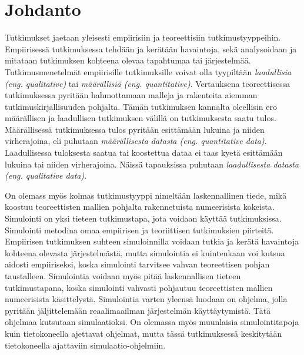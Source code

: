 \documentclass[utf8]{gradu3}
\begin{document}

\author{Jaakko Palm}

\maketitle

\mainmatter

\chapter{Johdanto} \label{johdanto}
Tutkimukset jaetaan yleisesti empiirisiin ja teoreettisiin tutkimustyyppeihin.
Empiirisessä tutkimuksessa tehdään  ja kerätään havaintoja, sekä analysoidaan 
ja mitataan tutkimuksen kohteena olevaa tapahtumaa tai järjestelmää. 
Tutkimusmenetelmät empiirisille tutkimuksille voivat olla 
tyypiltään \textit{laadullisia (eng. qualitative)} 
tai \textit{määrällisiä (eng. quantitative)}. 
Vertauksena teoreettisessa tutkimuksessa pyritään hahmottamaan 
malleja ja rakenteita aiemman tutkimuskirjallisuuden pohjalta. 
Tämän tutkimuksen kannalta oleellisin ero määrällisen ja laadullisen tutkimuksen 
välillä on tutkimuksesta saatu tulos.
Määrällisessä tutkimuksessa tulos pyritään esittämään lukuina ja niiden virherajoina,
eli puhutaan \textit{määrällisesta datasta (eng. quantitative data)}. 
Laadullisessa tuloksesta saatua tai koostettua dataa ei taas kyetä esittämään 
lukuina tai niiden virherajoina. Näissä tapauksissa puhutaan 
\textit{laadullisesta datasta (eng. qualitative data)}.

On olemass myös kolmas tutkimustyyppi nimeltään laskennallinen tiede, 
mikä koostuu teoreettisten mallien pohjalta rakennetuista numeerisista kokeista. 
Simulointi on yksi tieteen tutkimustapa, jota voidaan käyttää tutkimuksissa.
Simulointi metodina omaa empiirisen ja teoriittisen tutkimuksien piirteitä.
Empiirisen tutkimuksen suhteen simuloinnilla voidaan tutkia ja kerätä havaintoja
kohteena olevasta järjestelmästä, mutta simulointia ei 
kuintenkaan voi kutsua aidosti empiiriseksi,
koska simulointi tarvitsee vahvan teoreettisen pohjan taustalleen.
Simulointia voidaan myös pitää laskennallisen tieteen tutkimustapana, 
koska simulointi vahvasti pohjautuu teoreettisten mallien numeerisista käsittelystä.
Simulointia varten yleensä luodaan on ohjelma, 
jolla pyritään jäljittelemään reaalimaailman järjestelmän käyttäytymistä.
Tätä ohjelmaa kutsutaan simulaatioksi.
On olemassa myös muunlaisia simulointitapoja kuin tietokoneella ajettavat ohjelmat, mutta 
tässä tutkimuksessä keskitytään tietokoneella ajattaviin simulaatio-ohjelmiin.
\end{document}
